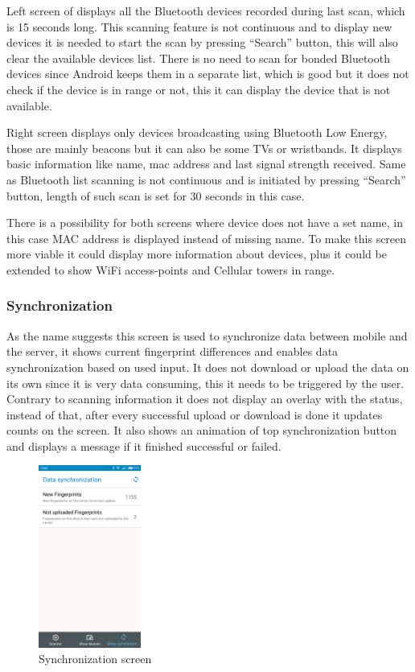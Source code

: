 Left screen of  displays all the Bluetooth devices recorded during last scan, which is 15 seconds long. This scanning feature is not continuous and to display new devices it is needed to start the scan by pressing \enquote{Search} button, this will also clear the available devices list. There is no need to scan for bonded Bluetooth devices since Android keeps them in a separate list, which is good but it does not check if the device is in range or not, this it can display the device that is not available.

Right screen displays only devices broadcasting using Bluetooth Low Energy, those are mainly beacons but it can also be some TVs or wristbands. It displays basic information like name, mac address and last signal strength received. Same as Bluetooth list scanning is not continuous and is initiated by pressing \enquote{Search} button, length of such scan is set for 30 seconds in this case.

There is a possibility for both screens where device does not have a set name, in this case MAC address is displayed instead of missing name. To make this screen more viable it could display more information about devices, plus it could be extended to show WiFi access-points and Cellular towers in range.

\subsubsection{Synchronization}\label{subsec:Synchronization}
As the name suggests this screen is used to synchronize data between mobile and the server, it shows current fingerprint differences and enables data synchronization based on used input. It does not download or upload the data on its own since it is very data consuming, this it needs to be triggered by the user. Contrary to scanning information it does not display an overlay with the status, instead of that, after every successful upload or download is done it updates counts on the screen. It also shows an animation of top synchronization button and displays a message if it finished successful or failed.

\begin{figure}[H]
	\begin{centering}
		\includegraphics[width=0.3\textwidth]{img/synchronization}
		\par\end{centering}
	\caption{Synchronization screen}
	\label{fig08c05}
\end{figure}

